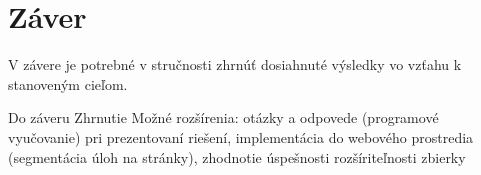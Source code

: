 \chapter{Záver}
V závere je potrebné v stručnosti zhrnúť dosiahnuté výsledky vo vzťahu k stanoveným cieľom.  

Do záveru
Zhrnutie
Možné rozšírenia: otázky a odpovede (programové vyučovanie) pri prezentovaní riešení, implementácia do webového prostredia (segmentácia úloh na stránky), zhodnotie úspešnosti rozšíriteľnosti zbierky